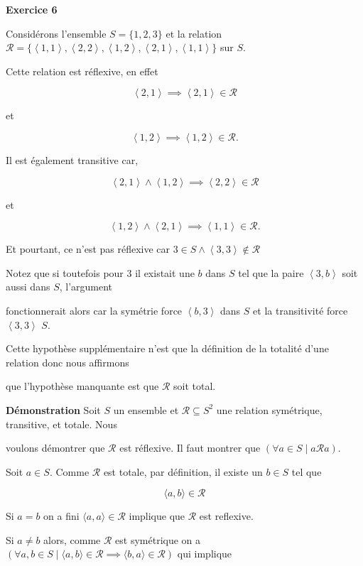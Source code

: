 \documentclass{article}
\newcommand{\tuple}[1]{\ensuremath{\left\langle #1 \right\rangle}}
\begin{document}
\textbf{Exercice 6}

\vspace{0.5cm}

Considérons l'ensemble $S = \{ 1, 2, 3 \}$ et la relation $\mathcal{R}=\{ \tuple{1,1}, \tuple{2,2},\tuple{1,2},\tuple{2,1},\tuple{1,1} \}$ sur $S$. 

Cette relation est réflexive, en effet

$$\tuple{2,1} \implies \tuple{2,1} \in \mathcal{R}$$

et

$$\tuple{1,2} \implies \tuple{1,2} \in \mathcal{R}.$$

Il est également transitive car,

$$\tuple{2,1} \land \tuple{1,2} \implies \tuple{2,2} \in \mathcal{R}$$

et

$$\tuple{1,2} \land \tuple{2,1}\implies \tuple{1,1} \in \mathcal{R}.$$

Et pourtant, ce n'est pas réflexive car $ 3 \in S \land \tuple{3,3} \notin \mathcal{R} $ 

\vspace{0.5cm}

Notez que si toutefois pour $3$ il existait une $b$ dans $S$ tel que la paire $\tuple{3,b}$ soit aussi dans $S$, l’argument 

fonctionnerait alors car la symétrie force $\tuple{b,3}$ dans $S$ et la transitivité force $\tuple{3,3}$ $S$.

Cette hypothèse supplémentaire n'est que la définition de la totalité d'une relation donc nous affirmons 

que l'hypothèse manquante est que $\mathcal{R}$ soit total.

\vspace{0.5cm}

\textbf{Démonstration} Soit \(S\) un ensemble et \(\mathcal{R} \subseteq S^2\) une relation symétrique, transitive, et totale. Nous 

voulons démontrer que \( \mathcal{R} \) est réflexive. Il faut montrer que $ ( \forall a \in S \mid a \mathcal{R} a)$.

Soit \(a \in S\). Comme \( \mathcal{R} \) est totale, par définition, il existe un \(b \in S\) tel que 

$$ \langle a, b \rangle \in \mathcal{R} $$

Si $a = b$ on a fini $ \langle a,a \rangle \in \mathcal{R}$ implique que $ \mathcal{R}$ est reflexive.

Si $a \neq b$ alors, comme $ \mathcal{R} $ est symétrique on a $(\forall a,b \in S \mid \langle a,b \rangle \in \mathcal{R} \implies \langle b,a \rangle \in \mathcal{R} )$ qui implique
\end{document}
